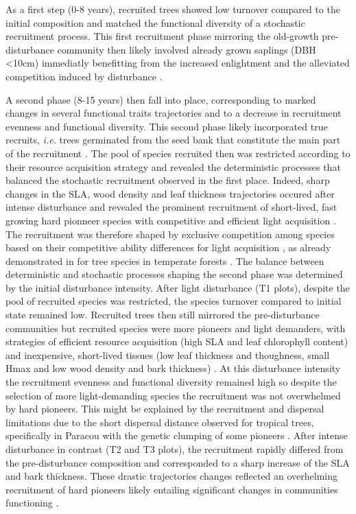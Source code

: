 \documentclass[fleqn,10pt]{ArtEcoFoG} %
\begin{document}
As a first step (0-8 years), recruited trees showed low turnover
compared to the initial composition and matched the functional diversity
of a stochastic recruitment process. This first recruitment phase
mirroring the old-growth pre-disturbance community then likely involved
already grown saplings (DBH \textless{}10cm) immediatly benefitting from
the increased enlightment and the alleviated competition induced by
disturbance \citep{Herault2010}.

A second phase (8-15 years) then fall into place, corresponding to
marked changes in several functional traits trajectories and to a
decrease in recruitment evenness and functional diversity. This second
phase likely incorporated true recruits, \emph{i.e.} trees germinated
from the seed bank that constitute the main part of the recruitment
\citep{Lawton1988}. The pool of species recruited then was restricted
according to their resource acquisition strategy and revealed the
deterministic processes that balanced the stochastic recruitment
observed in the first place. Indeed, sharp changes in the SLA, wood
density and leaf thickness trajectories occured after intense
disturbance and revealed the prominent recruitment of short-lived, fast
growing hard pionneer species with competitive and efficient light
acquisition \citep{Wright2004, Chave2009b, Herault2011, Reich2014}.\\
The recruitment was therefore shaped by exclusive competition among
species based on their competitive ability differences for light
acquisition \citep{Mayfield2010}, as already demonstrated in for tree
species in temperate forests \citep{Kunstler2012}. The balance between
deterministic and stochastic processes shaping the second phase was
determined by the initial disturbance intensity. After light disturbance
(T1 plots), despite the pool of recruited species was restricted, the
species turnover compared to initial state remained low. Recruited trees
then still mirrored the pre-disturbance communities but recruited
species were more pioneers and light demanders, with strategies of
efficient resource acquisition (high SLA and leaf chlorophyll content)
and inexpensive, short-lived tissues (low leaf thickness and thoughness,
small Hmax and low wood density and bark thickness)
\citep{Hubbell1999, Schnitzer2001, Sheil2003, Bongers2009}. At this
disturbance intensity the recruitment evenness and functional diversity
remained high so despite the selection of more light-demanding species
the recruitment was not overwhelmed by hard pioneers. This might be
explained by the recruitment and dispersal limitations due to the short
dispersal distance observed for tropical trees, specifically in Paracou
with the genetic clumping of some pioneers
\citep{Leclerc2015, Scotti2015a}. After intense disturbance in contrast
(T2 and T3 plots), the recruitment rapidly differed from the
pre-disturbance composition and corresponded to a sharp increase of the
SLA and bark thickness. These drastic trajectories changes reflected an
overhelming recruitment of hard pioneers likely entailing significant
changes in communities functioning \citep{Diaz2005}.
\end{document}
